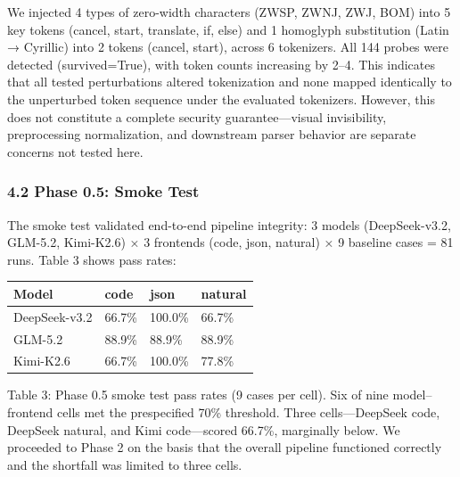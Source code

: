 We injected 4 types of zero-width characters (ZWSP, ZWNJ, ZWJ, BOM) into 5 key tokens (cancel, start, translate, if, else) and 1 homoglyph substitution (Latin → Cyrillic) into 2 tokens (cancel, start), across 6 tokenizers. All 144 probes were detected (survived=True), with token counts increasing by 2--4. This indicates that all tested perturbations altered tokenization and none mapped identically to the unperturbed token sequence under the evaluated tokenizers. However, this does not constitute a complete security guarantee---visual invisibility, preprocessing normalization, and downstream parser behavior are separate concerns not tested here.



\subsubsection{4.2 Phase 0.5: Smoke Test}\label{phase-0.5-smoke-test}



The smoke test validated end-to-end pipeline integrity: 3 models (DeepSeek-v3.2, GLM-5.2, Kimi-K2.6) × 3 frontends (code, json, natural) × 9 baseline cases = 81 runs. Table 3 shows pass rates:



{\def\LTcaptype{none} %

\begin{longtable}[]{@{}llll@{}}

\toprule\noalign{}

Model & code & json & natural \\

\midrule\noalign{}

\endhead

\bottomrule\noalign{}

\endlastfoot

DeepSeek-v3.2 & 66.7\% & 100.0\% & 66.7\% \\

GLM-5.2 & 88.9\% & 88.9\% & 88.9\% \\

Kimi-K2.6 & 66.7\% & 100.0\% & 77.8\% \\

\end{longtable}

}



Table 3: Phase 0.5 smoke test pass rates (9 cases per cell). Six of nine model--frontend cells met the prespecified 70\% threshold. Three cells---DeepSeek code, DeepSeek natural, and Kimi code---scored 66.7\%, marginally below. We proceeded to Phase 2 on the basis that the overall pipeline functioned correctly and the shortfall was limited to three cells.



